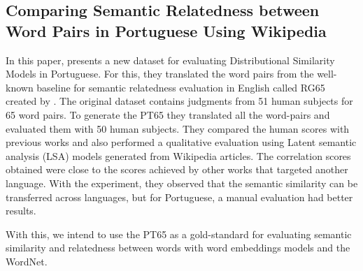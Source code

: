 \subsection{Comparing Semantic Relatedness between Word Pairs in Portuguese Using Wikipedia}

In this paper,  presents a new dataset for evaluating Distributional Similarity Models in Portuguese. For this, they translated the word pairs from the well-known baseline for semantic relatedness evaluation in English called RG65 created by . The original dataset contains judgments from 51 human subjects for 65 word pairs. To generate the PT65 they translated all the word-pairs and evaluated them with 50 human subjects. They compared the human scores with previous works and also performed a qualitative evaluation using Latent semantic analysis (LSA) models generated from Wikipedia articles. The correlation scores obtained were close to the scores achieved by other works that targeted another language. With the experiment, they observed that the semantic similarity can be transferred across languages, but for Portuguese, a manual evaluation had better results. 

With this, we intend to use the PT65 as a gold-standard for evaluating semantic similarity and relatedness between words with word embeddings models and the WordNet.

 

